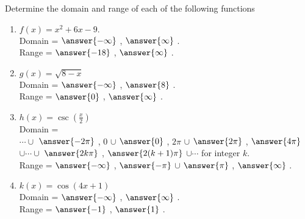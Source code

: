 \documentclass{ximera}
\author{Elizabeth Campolongo}
\begin{document}
\begin{exercise}
Determine the domain and range of each of the following functions
%
\begin{enumerate}

\item $f(x) = x^2+6x-9.$\\
Domain = \wordChoice{\choice[correct]{(}\choice{[}} $\answer{-\infty}$ , $\answer{\infty}$ \wordChoice{\choice[correct]{)}\choice{]}}.\\
Range = \wordChoice{\choice{(}\choice[correct]{[}} $\answer{-18}$ , $\answer{\infty}$ \wordChoice{\choice[correct]{)}\choice{]}}.


\item $g(x) = \sqrt{8-x} $\\
Domain = \wordChoice{\choice[correct]{(}\choice{[}} $\answer{-\infty}$ , $\answer{8}$ \wordChoice{\choice{)}\choice[correct]{]}}.\\
Range = \wordChoice{\choice{(}\choice[correct]{[}} $\answer{0}$ , $\answer{\infty}$ \wordChoice{\choice[correct]{)}\choice{]}}.


\item $h(x) = \csc\!\left(\frac{x}{2}\right)$\\
Domain = \\
$\cdots \cup$
\wordChoice{\choice[correct]{(}\choice{[}} $\answer{-2\pi}$ , 0 \wordChoice{\choice[correct]{)}\choice{]}} 
$\cup$ 
\wordChoice{\choice[correct]{(}\choice{[}} $\answer{0}$ , $2\pi$ \wordChoice{\choice[correct]{)}\choice{]}} 
$\cup$ 
\wordChoice{\choice[correct]{(}\choice{[}} $\answer{2\pi}$ , $\answer{4\pi}$ \wordChoice{\choice[correct]{)}\choice{]}} 
$\cup \cdots \cup$
\wordChoice{\choice[correct]{(}\choice{[}} $\answer{2k\pi}$ , $\answer{2(k+1)\pi}$ \wordChoice{\choice[correct]{)}\choice{]}}
$\cup \cdots$ for integer $k$.
\\
Range = \wordChoice{\choice[correct]{(}\choice{[}} 
$\answer{-\infty}$ , $\answer{-\pi}$ 
\wordChoice{\choice{)}\choice[correct]{]}} 
$\cup$  
\wordChoice{\choice{(}\choice[correct]{[}} 
$\answer{\pi}$ , $\answer{\infty}$ 
\wordChoice{\choice[correct]{)}\choice{]}}.

\item $k(x) = \cos(4x+1)$ \\
Domain = \wordChoice{\choice[correct]{(}\choice{[}} 
$\answer{-\infty}$ , $\answer{\infty}$ 
\wordChoice{\choice[correct]{)}\choice{]}}.\\
Range = \wordChoice{\choice{(}\choice[correct]{[}} $\answer{-1}$ , $\answer{1}$ \wordChoice{\choice{)}\choice[correct]{]}}.



\end{enumerate}
\end{exercise}
\end{document}
